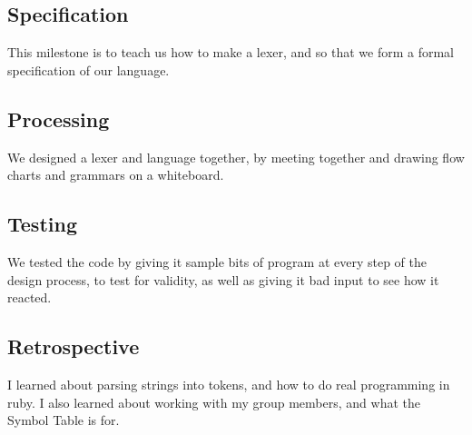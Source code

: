 \documentclass[12pt]{article}
\begin{document}
\subsection{Specification}
This milestone is to teach us how to make a lexer, and so that we form a
formal specification of our language.

\subsection{Processing}
We designed a lexer and language together, by meeting together and drawing flow
charts and grammars on a whiteboard.

\subsection{Testing}
We tested the code by giving it sample bits of program at every step of the
design process, to test for validity, as well as giving it bad input to see how
it reacted.

\subsection{Retrospective}
I learned about parsing strings into tokens, and how to do real programming in
ruby. I also learned about working with my group members, and what the Symbol
Table is for.
\end{document}
